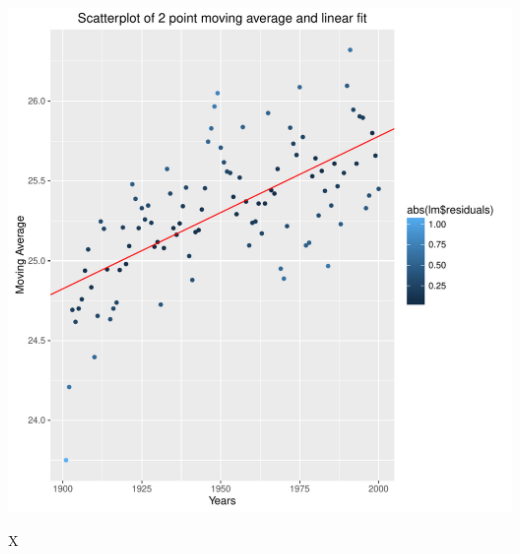\documentclass[a4paper]{article}
\begin{document}
\begin{minipage}{\linewidth}
\begin{center}
\includegraphics[width=.5\linewidth]{TAutocorrmovingavg.pdf}
\end{center}
\end{minipage}X
\end{document}
